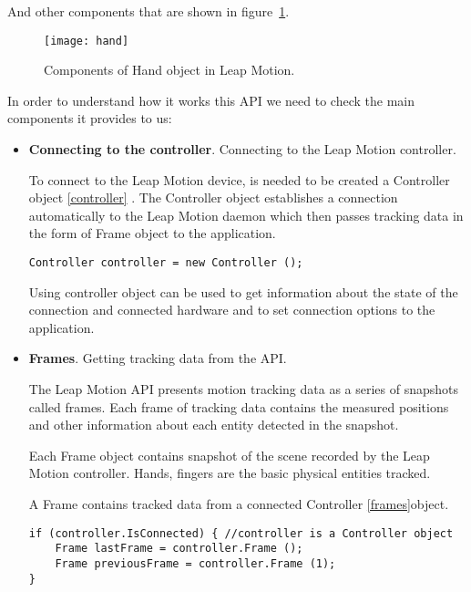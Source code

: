 {And other components that are shown in \mbox{figure \ref{hand}}.
\begin{figure}[!h]
\centering
\texttt{[image: hand]}
\caption{Components of Hand object in Leap Motion. \cite{leapapi}}\label{hand}

\end{figure}

In order to understand how it works this API we need to check the main components it provides to us:

\begin{itemize}
\item \textbf{Connecting to the controller}. Connecting to the Leap Motion controller.


To connect to the Leap Motion device, is needed to be created a Controller object 
\autoref{controller} . The Controller object establishes a connection automatically to the Leap Motion daemon which then passes tracking data in the form of Frame object to the application.

\begin{lstlisting}[caption={Controller object creation in C\#},label={controller}]
Controller controller = new Controller ();
\end{lstlisting}

Using controller object can be used to get information about the state of the connection and connected hardware and to set connection options to the application.


\item \textbf{Frames}. Getting tracking data from the API.

The Leap Motion API presents motion tracking data as a series of snapshots called frames. Each frame of tracking data contains the measured positions and other information about each entity detected in the snapshot.

Each Frame object contains snapshot of the scene recorded by the Leap Motion controller. Hands, fingers are the basic physical entities tracked.

A Frame contains tracked data from a connected Controller  \autoref{frames}object.

\begin{lstlisting}[caption={Accesing last and previous frame from a controller object.},label={frames}]
if (controller.IsConnected) { //controller is a Controller object
    Frame lastFrame = controller.Frame (); 
    Frame previousFrame = controller.Frame (1);
}
\end{lstlisting}


\end{itemize}}
